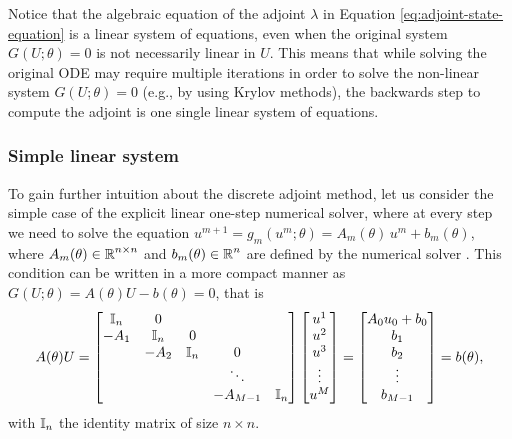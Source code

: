 Notice that the algebraic equation of the adjoint $\lambda$ in Equation \eqref{eq:adjoint-state-equation} is a linear system of equations, even when the original system $G(U; \theta)=0$ is not necessarily linear in $U$.
This means that while solving the original ODE may require multiple iterations in order to solve the non-linear system $G(U; \theta) = 0$ (e.g., by using Krylov methods), the backwards step to compute the adjoint is one single linear system of equations. 

\subsubsection{Simple linear system}

To gain further intuition about the discrete adjoint method, let us consider the simple case of the explicit linear one-step numerical solver, where at every step we need to solve the equation $u^{m+1} = g_m (u^m; \theta) = A_m (\theta) \, u^m + b_m(\theta)$, where $A_m(\theta) \in \operatorname{\mathbb{R}}^{n \times n}$ and $b_m(\theta) \in \operatorname{\mathbb{R}}^n$ are defined by the numerical solver \cite{Johnson}. 
This condition can be written in a more compact manner as $G(U; \theta)=A(\theta) U - b(\theta) = 0$, that is 
\begin{equation}
    A(\theta) U 
    = 
    \begin{bmatrix}
        \operatorname{\mathbb{I}}_{n} & 0 &   &  & \\
        -A_1 & \operatorname{\mathbb{I}}_{n} & 0 &  &  \\
          & -A_2 & \operatorname{\mathbb{I}}_{n} & 0 &  \\
         &  &   & \ddots &   \\
         &  &  & -A_{M-1} & \operatorname{\mathbb{I}}_{n}
    \end{bmatrix}
    \begin{bmatrix}
        u^1 \\
        u^2 \\
        u^3 \\
        \vdots \\
        u^M
    \end{bmatrix}
    = 
    \begin{bmatrix}
        A_0 u_0 + b_0 \\
        b_1 \\
        b_2 \\
        \vdots \\
        b_{M-1}
    \end{bmatrix}
    = 
    b(\theta), 
\end{equation}
with $\operatorname{\mathbb{I}}_{n}$ the identity matrix of size $n \times n$.
